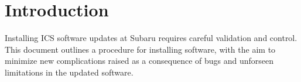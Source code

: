 \section{Introduction}

Installing ICS software updates at Subaru requires careful validation
and control. This document outlines a procedure for installing software,
with the aim to minimize new complications raised as a consequence of bugs 
and unforseen limitations in the updated software.


